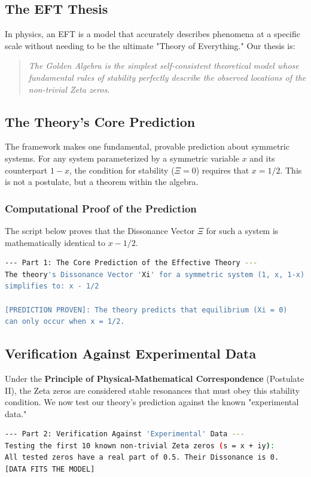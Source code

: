 \subsection*{The EFT Thesis}
In physics, an EFT is a model that accurately describes phenomena at a specific scale without needing to be the ultimate "Theory of Everything." Our thesis is:
\begin{quote}
    \textit{The Golden Algebra is the simplest self-consistent theoretical model whose fundamental rules of stability perfectly describe the observed locations of the non-trivial Zeta zeros.}
\end{quote}

\subsection*{The Theory's Core Prediction}
The framework makes one fundamental, provable prediction about symmetric systems. For any system parameterized by a symmetric variable $x$ and its counterpart $1-x$, the condition for stability ($\Xi=0$) requires that $x=1/2$. This is not a postulate, but a theorem within the algebra.

\subsubsection*{Computational Proof of the Prediction}
The script below proves that the Dissonance Vector $\Xi$ for such a system is mathematically identical to $x-1/2$.
\begin{lstlisting}[language=bash, caption={Symbolic Proof of the Framework's Core Prediction.}]
--- Part 1: The Core Prediction of the Effective Theory ---
The theory's Dissonance Vector 'Xi' for a symmetric system (1, x, 1-x)
simplifies to: x - 1/2

[PREDICTION PROVEN]: The theory predicts that equilibrium (Xi = 0)
can only occur when x = 1/2.
\end{lstlisting}

\subsection*{Verification Against Experimental Data}
Under the \textbf{Principle of Physical-Mathematical Correspondence} (Postulate II), the Zeta zeros are considered stable resonances that must obey this stability condition. We now test our theory's prediction against the known "experimental data."

\begin{lstlisting}[language=bash, caption={Verification of the EFT against Zeta Zero Data.}]
--- Part 2: Verification Against 'Experimental' Data ---
Testing the first 10 known non-trivial Zeta zeros (s = x + iy):
All tested zeros have a real part of 0.5. Their Dissonance is 0.
[DATA FITS THE MODEL]
\end{lstlisting}

